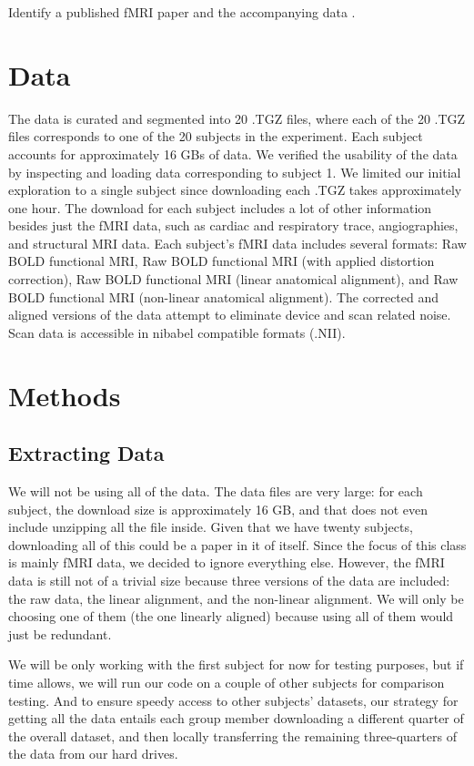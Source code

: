\documentclass[11pt]{article}
\begin{document}
Identify a published fMRI paper and the accompanying data
\cite{hank2014audiomovie}.

\section{Data}

The data is curated and segmented into 20 .TGZ files, where each of the 20
.TGZ files corresponds to one of the 20 subjects in the experiment. Each
subject accounts for approximately 16 GBs of data. We verified the usability
of the data by inspecting and loading data corresponding to subject 1. We
limited our initial exploration to a single subject since downloading each
.TGZ takes approximately one hour. The download for each subject includes a
lot of other information besides just the fMRI data, such as cardiac and
respiratory trace, angiographies, and structural MRI data. Each subject's fMRI
data includes several formats: Raw BOLD functional MRI, Raw BOLD functional
MRI (with applied distortion correction), Raw BOLD functional MRI (linear
anatomical alignment), and Raw BOLD functional MRI (non-linear anatomical
alignment). The corrected and aligned versions of the data attempt to
eliminate device and scan related noise. Scan data is accessible in nibabel
compatible formats (.NII).

\section{Methods}

\subsection{Extracting Data}

We will not be using all of the data. The data
files are very large: for each subject, the download size is approximately 16
GB, and that does not even include unzipping all the file inside. Given that
we have twenty subjects, downloading all of this could be a paper in it of
itself. Since the focus of this class is mainly fMRI data, we decided to
ignore everything else. However, the fMRI data is still not of a trivial size
because three versions of the data are included: the raw data, the linear
alignment, and the non-linear alignment. We will only be choosing one of them
(the one linearly aligned) because using all of them would just be redundant.

We will be only working with the first subject for now for testing purposes,
but if time allows, we will run our code on a couple of other subjects for
comparison testing. And to ensure speedy access to other subjects' datasets,
our strategy for getting all the data entails each group member downloading a
different quarter of the overall dataset, and then locally transferring the
remaining three-quarters of the data from our hard drives.
\end{document}
